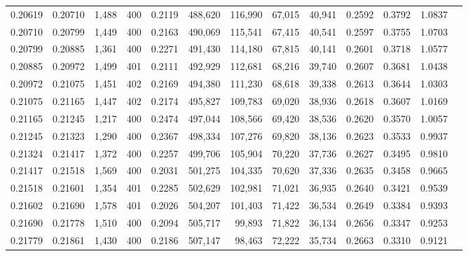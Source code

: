 \begin{tabular}{rrrrrrrrrrrrr}
0.20619 & 0.20710 & 1,488 & 400 &                                     0.2119 & 488,620 & 116,990 &  67,015 &  40,941 & 0.2592 & 0.3792 & 1.0837 \\
0.20710 & 0.20799 & 1,449 & 400 &                                     0.2163 & 490,069 & 115,541 &  67,415 &  40,541 & 0.2597 & 0.3755 & 1.0703 \\
0.20799 & 0.20885 & 1,361 & 400 &                                     0.2271 & 491,430 & 114,180 &  67,815 &  40,141 & 0.2601 & 0.3718 & 1.0577 \\
0.20885 & 0.20972 & 1,499 & 401 &                                     0.2111 & 492,929 & 112,681 &  68,216 &  39,740 & 0.2607 & 0.3681 & 1.0438 \\
0.20972 & 0.21075 & 1,451 & 402 &                                     0.2169 & 494,380 & 111,230 &  68,618 &  39,338 & 0.2613 & 0.3644 & 1.0303 \\
0.21075 & 0.21165 & 1,447 & 402 &                                     0.2174 & 495,827 & 109,783 &  69,020 &  38,936 & 0.2618 & 0.3607 & 1.0169 \\
0.21165 & 0.21245 & 1,217 & 400 &                                     0.2474 & 497,044 & 108,566 &  69,420 &  38,536 & 0.2620 & 0.3570 & 1.0057 \\
0.21245 & 0.21323 & 1,290 & 400 &                                     0.2367 & 498,334 & 107,276 &  69,820 &  38,136 & 0.2623 & 0.3533 & 0.9937 \\
0.21324 & 0.21417 & 1,372 & 400 &                                     0.2257 & 499,706 & 105,904 &  70,220 &  37,736 & 0.2627 & 0.3495 & 0.9810 \\
0.21417 & 0.21518 & 1,569 & 400 &                                     0.2031 & 501,275 & 104,335 &  70,620 &  37,336 & 0.2635 & 0.3458 & 0.9665 \\
0.21518 & 0.21601 & 1,354 & 401 &                                     0.2285 & 502,629 & 102,981 &  71,021 &  36,935 & 0.2640 & 0.3421 & 0.9539 \\
0.21602 & 0.21690 & 1,578 & 401 &                                     0.2026 & 504,207 & 101,403 &  71,422 &  36,534 & 0.2649 & 0.3384 & 0.9393 \\
0.21690 & 0.21778 & 1,510 & 400 &                                     0.2094 & 505,717 &  99,893 &  71,822 &  36,134 & 0.2656 & 0.3347 & 0.9253 \\
0.21779 & 0.21861 & 1,430 & 400 &                                     0.2186 & 507,147 &  98,463 &  72,222 &  35,734 & 0.2663 & 0.3310 & 0.9121 \\

\end{tabular}
